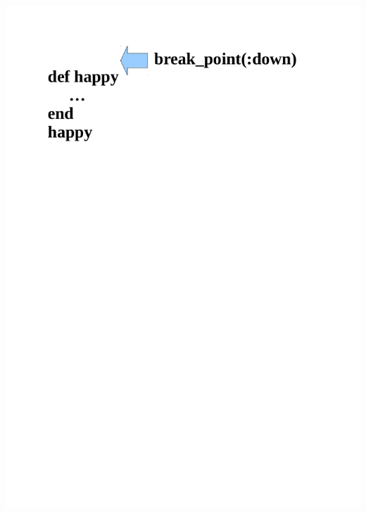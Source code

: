 \begin{frame}
	\begin{center}
		\ \\ \ \\
		\includegraphics[scale=0.4]{scopes/beispiel5.pdf}
	\end{center}
\end{frame}

